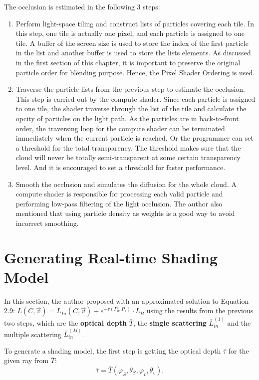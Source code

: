 The occlusion is estimated in the following 3 steps:
\begin{enumerate}
\item Perform light-space tiling and construct lists of particles
covering each tile. In this step, one tile is actually one pixel, and each particle is assigned to one tile. A buffer of the screen size is used to store the index of the first particle in the list and another buffer is used to store the lists elements. As discussed in the first section of this chapter, it is important to preserve the original particle order for blending purpose. Hence, the Pixel Shader Ordering is used.
\item Traverse the particle lists from the previous step to estimate the occlusion. This step is carried out by the compute shader. Since each particle is assigned to one tile, the shader traverse through the list of the tile and calculate the opcity of particles on the light path. As the particles are in back-to-front order, the traversing loop for the compute shader can be terminated immediately when the current particle is reached. Or the programmer can set a threshold for the total transparency. The threshold makes sure that the cloud will never be totally semi-transparent at some certain transparency level. And it is encouraged to set a threshold for faster performance.
\item Smooth the occlusion and simulates the diffusion for the whole cloud. A compute shader is responsible for processing each valid particle and performing low-pass filtering of the light occlusion. The author also mentioned that using particle density as weights is a good way to avoid incorrect smoothing.
\end{enumerate}


\section{Generating Real-time Shading Model}
In this section, the author proposed with an approximated solution to Equation 2.9: $L(C, \vec{v}) = L_{In}(C, \vec{v}) + e^{-\tau(P_0, P_1)} \cdot L_B$ using the results from the previous two steps, which are the \textbf{optical depth} $\overline{T}$, the \textbf{single scattering} $\overline{L}_{in}^{(1)}$ and the multiple scattering $\overline{L}_{in}^{(M)}$.

To generate a shading model, the first step is getting the optical depth $\overline{\tau}$ for the given ray from $\overline{T}$:
\begin{equation}
\overline{\tau} = \overline{T}(\varphi_S, \theta_S, \varphi_v, \theta_v).
\end{equation}

